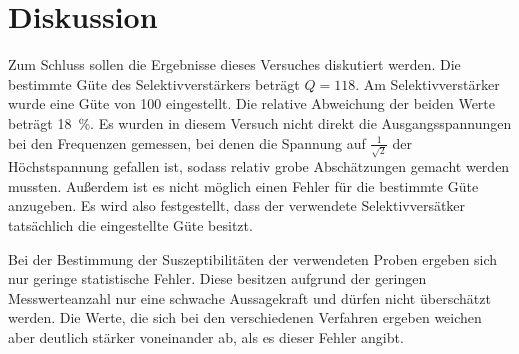 
\section{Diskussion}
%
Zum Schluss sollen die Ergebnisse dieses Versuches diskutiert werden.
Die bestimmte Güte des Selektivverstärkers beträgt $Q=\num{118}$.  Am
Selektivverstärker wurde eine Güte von 100 eingestellt.  Die relative
Abweichung der beiden Werte beträgt \SI{18}{\percent}.  Es wurden in
diesem Versuch nicht direkt die Ausgangsspannungen bei den Frequenzen
gemessen, bei denen die Spannung auf $\frac{1}{\sqrt{2}}$ der
Höchstspannung gefallen ist, sodass relativ grobe Abschätzungen gemacht
werden mussten.  Außerdem ist es nicht möglich einen Fehler für die
bestimmte Güte anzugeben.  Es wird also festgestellt, dass der
verwendete Selektivversätker tatsächlich die eingestellte Güte besitzt.

Bei der Bestimmung der Suszeptibilitäten der verwendeten Proben ergeben
sich nur geringe statistische Fehler.  Diese besitzen aufgrund der
geringen Messwerteanzahl nur eine schwache Aussagekraft und dürfen nicht
überschätzt werden.  Die Werte, die sich bei den verschiedenen Verfahren
ergeben weichen aber deutlich stärker voneinander ab, als es dieser
Fehler angibt.
%
